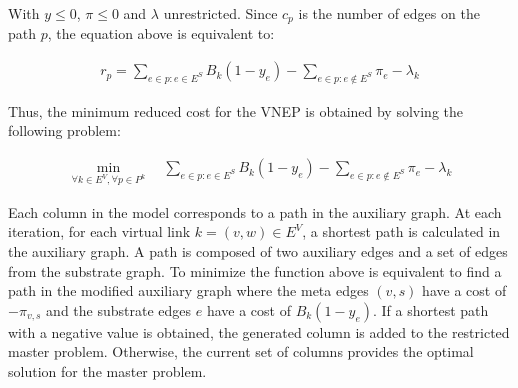 \documentclass[conference]{IEEEtran}
\begin{document}
With $y \leq 0$, $\pi \leq 0$ and $\lambda$ unrestricted. Since $c_p$ is the number of edges on the path $p$, the equation above is equivalent to:

\begin{align}
  r_{p} = \sum\limits_{e \in p : e \in E^S} B_{k} (1 - y_{e}) - \sum\limits_{e \in p : e \notin E^S} \pi_e - \lambda_{k} \nonumber
\end{align}

Thus, the minimum reduced cost for the VNEP is obtained by solving the following problem:

\begin{align}
  \min_{ \forall k \in E^{V}, \forall p \in P^{k}}  \quad  \sum\limits_{e \in p : e \in E^S} B_{k} (1 - y_{e}) - \sum\limits_{e \in p : e \notin E^S} \pi_{e}-\lambda_{k} \nonumber
\end{align}

Each column in the model corresponds to a path in the auxiliary graph. At each iteration, for each virtual link $k = (v,w) \in E^V$, a shortest path is calculated in the auxiliary graph. A path is composed of two auxiliary edges and a set of edges from the substrate graph. To minimize the function above is equivalent to find a path in the modified auxiliary graph where the meta edges $(v,s)$ have a cost of $-\pi_{v,s}$ and the substrate edges $e$ have a cost of $B_{k}(1 - y_{e})$. If a shortest path with a negative value is obtained, the generated column is added to the restricted master problem. Otherwise, the current set of columns provides the optimal solution for the master problem.

\end{document}

